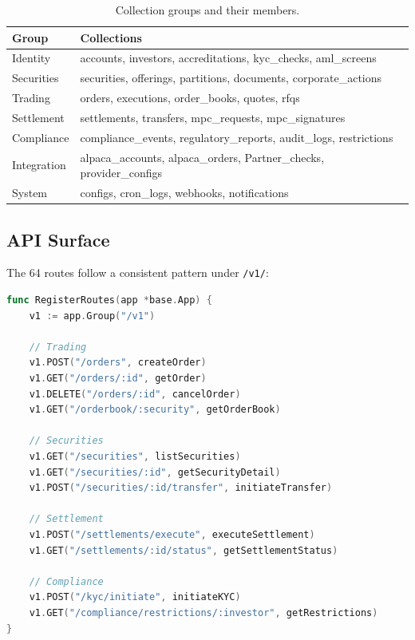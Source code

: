 \documentclass[11pt,a4paper]{article}
\begin{document}
\begin{table}[H]
\centering
\caption{Collection groups and their members.}
\label{tab:collections}
\begin{tabular}{lp{8cm}}
\toprule
\textbf{Group} & \textbf{Collections} \\
\midrule
Identity & accounts, investors, accreditations, kyc\_checks, aml\_screens \\
Securities & securities, offerings, partitions, documents, corporate\_actions \\
Trading & orders, executions, order\_books, quotes, rfqs \\
Settlement & settlements, transfers, mpc\_requests, mpc\_signatures \\
Compliance & compliance\_events, regulatory\_reports, audit\_logs, restrictions \\
Integration & alpaca\_accounts, alpaca\_orders, Partner\_checks, provider\_configs \\
System & configs, cron\_logs, webhooks, notifications \\
\bottomrule
\end{tabular}
\end{table}

\subsection{API Surface}

The 64 routes follow a consistent pattern under \texttt{/v1/}:

\begin{lstlisting}[language=Go,caption={Route registration pattern.}]
func RegisterRoutes(app *base.App) {
    v1 := app.Group("/v1")

    // Trading
    v1.POST("/orders", createOrder)
    v1.GET("/orders/:id", getOrder)
    v1.DELETE("/orders/:id", cancelOrder)
    v1.GET("/orderbook/:security", getOrderBook)

    // Securities
    v1.GET("/securities", listSecurities)
    v1.GET("/securities/:id", getSecurityDetail)
    v1.POST("/securities/:id/transfer", initiateTransfer)

    // Settlement
    v1.POST("/settlements/execute", executeSettlement)
    v1.GET("/settlements/:id/status", getSettlementStatus)

    // Compliance
    v1.POST("/kyc/initiate", initiateKYC)
    v1.GET("/compliance/restrictions/:investor", getRestrictions)
}
\end{lstlisting}
\end{document}
